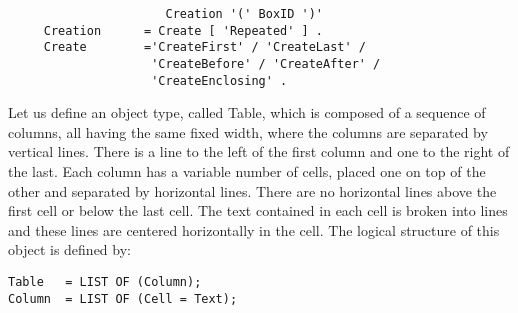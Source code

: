 \begin{verbatim}
                      Creation '(' BoxID ')'
     Creation      = Create [ 'Repeated' ] .
     Create        ='CreateFirst' / 'CreateLast' /
                    'CreateBefore' / 'CreateAfter' /
                    'CreateEnclosing' .
\end{verbatim}

\begin{example}
Let us define an object type, called Table, which is composed of a
sequence of columns, all having the same fixed width, where the
columns are separated by vertical lines.  There is a line to the left
of the first column and one to the right of the last.  Each column has
a variable number of cells, placed one on top of the other and
separated by horizontal lines.  There are no horizontal lines above
the first cell or below the last cell.  The text contained in each
cell is  broken into lines and these lines are centered horizontally
in the cell. The logical structure of this object is defined by:

\begin{verbatim}
Table   = LIST OF (Column);
Column  = LIST OF (Cell = Text);
\end{verbatim}


\end{example}
